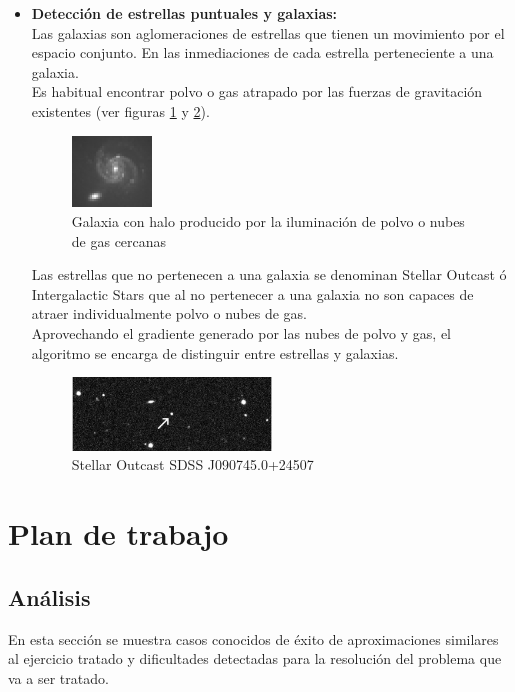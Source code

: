 \begin{itemize}
		
		\item \textbf{Detección de estrellas puntuales y galaxias:}\\
		Las galaxias son aglomeraciones de estrellas que tienen un movimiento
		por el espacio conjunto. En las inmediaciones de cada estrella perteneciente
		a una galaxia.\\
		Es habitual encontrar polvo o gas atrapado por las fuerzas 	de gravitación existentes (ver figuras \ref{fig:GalaxiHalo} y \ref{fig:IntergalacticStar}).\\
		\begin{figure}[!htb]
			\centering
			\includegraphics[width=0.2\textwidth]{images/twoGalaxyHalo.jpg}
			\caption{\label{fig:GalaxiHalo}\small Galaxia con halo producido por la iluminación de polvo o nubes de gas cercanas}
		\end{figure}
		Las estrellas que no pertenecen a una galaxia se denominan Stellar Outcast\cite{stellarOutcast} ó Intergalactic Stars que al no pertenecer a una galaxia no son capaces de atraer individualmente polvo o nubes de gas.\\
		Aprovechando el gradiente generado por las nubes de polvo y gas, el	algoritmo se encarga de distinguir entre estrellas y galaxias.
		\begin{figure}[!htb]%
			\centering
			\includegraphics[width=0.5\textwidth]{images/star.jpg}
			\caption{\label{fig:IntergalacticStar}{\small Stellar Outcast SDSS J090745.0+24507}}
		\end{figure}

	\end{itemize}	

	\vfill

	\section{Plan de trabajo}
	\subsection{Análisis }
		En esta sección se muestra casos conocidos de éxito de aproximaciones similares al ejercicio tratado y dificultades detectadas para la resolución del problema que va a ser tratado.
